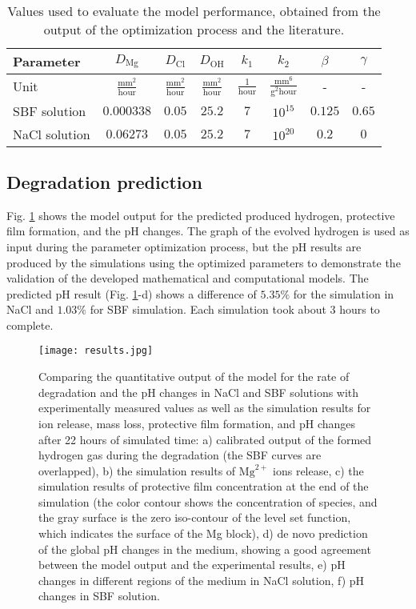 \begin{table}[t]
\caption[Values used in the biodegradation model simulation performance]{Values used to evaluate the model performance, obtained from the output of the optimization process and the literature.}
\medskip
\centering
\begin{tabular}{lccccccc}
Parameter & $D_\mathrm{Mg}$ & $D_\mathrm{Cl}$ & $D_\mathrm{OH}$ & $k_1$ & $k_2$ & $\beta$ & $\gamma$ \\ \hline
Unit      & $\frac{\mathrm{mm}^2}{\mathrm{hour}}$ & $\frac{\mathrm{mm}^2}{\mathrm{hour}}$ & $\frac{\mathrm{mm}^2}{\mathrm{hour}}$ & $\frac{1}{\mathrm{hour}}$ & $\frac{\mathrm{mm}^6}{\mathrm{g}^2 \mathrm{hour}}$ & - & - \\ \hline
{SBF} solution       & $0.000338$ & $0.05$ & $25.2$ & $7$ & $10^{15}$ & $0.125$ & $0.65$  \\
NaCl solution      & $0.06273$ & $0.05$ & $25.2$ & $7$ & $10^{20}$ & $0.2$ & $0$
\end{tabular}
\label{tab:parameters}
\end{table}

\subsection{Degradation prediction}

Fig. \ref{fig:results} shows the model output for the predicted produced hydrogen, protective film formation, and the pH changes. The graph of the evolved hydrogen is used as input during the parameter optimization process, but the pH results are produced by the simulations using the optimized parameters to demonstrate the validation of the developed mathematical and computational models. The predicted pH result (Fig. \ref{fig:results}-d) shows a difference of $5.35 \%$ for the simulation in NaCl and $1.03 \%$ for {SBF} simulation. Each simulation took about 3 hours to complete.

\begin{figure}[t]
\centering
\medskip
\texttt{[image: results.jpg]}
\caption[Simulation results of the cuboid sample in the biodegradation test]{Comparing the quantitative output of the model for the rate of degradation and the pH changes in NaCl and {SBF} solutions with experimentally measured values as well as the simulation results for ion release, mass loss, protective film formation, and pH changes after 22 hours of simulated time: a) calibrated output of the formed hydrogen gas during the degradation (the {SBF} curves are overlapped), b) the simulation results of $\mathrm{Mg}^{2+}$ ions release, c) the simulation results of protective film concentration at the end of the simulation (the color contour shows the concentration of species, and the gray surface is the zero iso-contour of the level set function, which indicates the surface of the Mg block), d) de novo prediction of the global pH changes in the medium, showing a good agreement between the model output and the experimental results, e) pH changes in different regions of the medium in NaCl solution, f) pH changes in {SBF} solution.} \label{fig:results}
\end{figure}

